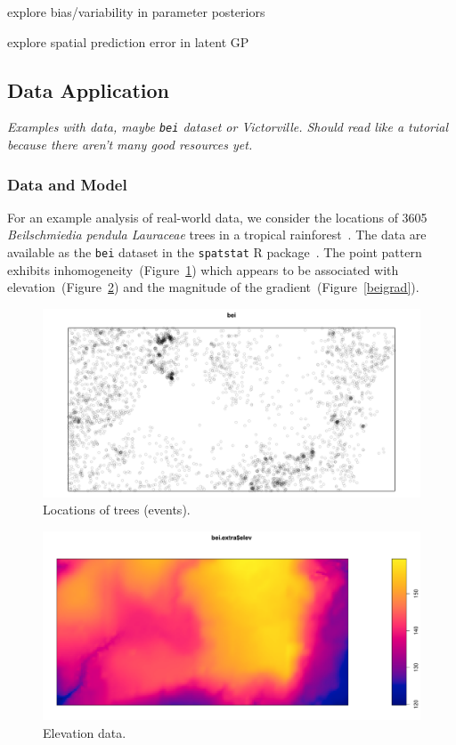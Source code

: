 \documentclass[]{interact}
\begin{document}
explore bias/variability in parameter posteriors

explore spatial prediction error in latent GP


\subsection{Data Application}

{\it Examples with data, maybe \texttt{bei} dataset or Victorville. Should read
like a tutorial because there aren't many good resources yet.}

\subsubsection{Data and Model}

For an example analysis of real-world data, we consider the locations of
3605 \emph{Beilschmiedia pendula Lauraceae} trees in a tropical
rainforest~\cite{moellerwaagepetersen}. The data are available as the
\texttt{bei} dataset in the \texttt{spatstat} R package~\cite{spatstat}.
The point pattern exhibits inhomogeneity~(Figure~\ref{bei}) which appears
to be associated with elevation~(Figure~\ref{beielev}) and the magnitude of
the gradient~(Figure~\ref{beigrad}).

\begin{figure}[h]
\includegraphics[width=\textwidth]{figures/bei.pdf}
\caption{Locations of trees (events).}
\label{bei}
\end{figure}

\begin{figure}[h]
\includegraphics[width=\textwidth]{figures/beielev.pdf}
\caption{Elevation data.}
\label{beielev}
\end{figure}
\end{document}
